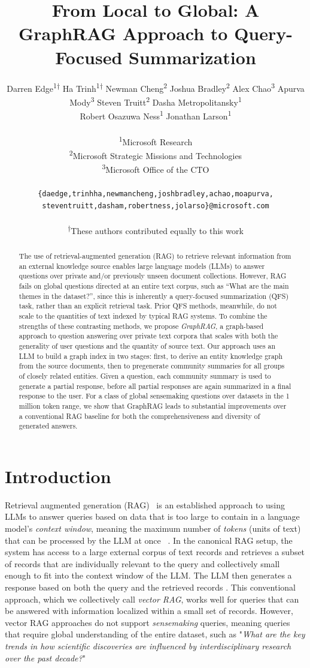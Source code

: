 \documentclass{article}
\title{From Local to Global: A GraphRAG Approach to Query-Focused Summarization}
\author{%
    Darren Edge\textsuperscript{1†} 
    \And Ha Trinh\textsuperscript{1†} 
    \And Newman Cheng\textsuperscript{2} 
    \And Joshua Bradley\textsuperscript{2} 
    \And Alex Chao\textsuperscript{3} 
    \And Apurva Mody\textsuperscript{3} 
    \And Steven Truitt\textsuperscript{2} 
    \And Dasha Metropolitansky\textsuperscript{1}\\ 
    \And Robert Osazuwa Ness\textsuperscript{1}
    \And Jonathan Larson\textsuperscript{1} \\\\
  \textsuperscript{1}Microsoft Research\\
  \textsuperscript{2}Microsoft Strategic Missions and Technologies\\
  \textsuperscript{3}Microsoft Office of the CTO\\
  \\ 
  \texttt{\{daedge,trinhha,newmancheng,joshbradley,achao,moapurva,} \\
  \small
\texttt{steventruitt,dasham,robertness,jolarso\}@microsoft.com} \\ \\
\small
\textsuperscript{†}These authors contributed equally to this work 
}
\begin{document}
\maketitle

\begin{abstract}
The use of retrieval-augmented generation (RAG) to retrieve relevant information from an external knowledge source enables large language models (LLMs) to answer questions over private and/or previously unseen document collections.
However, RAG fails on global questions directed at an entire text corpus, such as ``What are the main themes in the dataset?'', since this is inherently a query-focused summarization (QFS) task, rather than an explicit retrieval task.
Prior QFS methods, meanwhile, do not scale to the quantities of text indexed by typical RAG systems. 
To combine the strengths of these contrasting methods, we propose \textit{GraphRAG}, a graph-based approach to question answering over private text corpora that scales with both the generality of user questions and the quantity of source text.
Our approach uses an LLM to build a graph index in two stages: first, to derive an entity knowledge graph from the source documents, then to pregenerate community summaries for all groups of closely related entities.
Given a question, each community summary is used to generate a partial response, before all partial responses are again summarized in a final response to the user.
For a class of global sensemaking questions over datasets in the 1 million token range, we show that GraphRAG leads to substantial improvements over a conventional RAG baseline for both the comprehensiveness and diversity of generated answers.

\end{abstract}

\section{Introduction}

Retrieval augmented generation (RAG)~\citep{lewis2020retrieval} is an established approach to using LLMs to answer queries based on data that is too large to contain in a language model's \emph{context window}, meaning the maximum number of \emph{tokens} (units of text) that can be processed by the LLM at once ~\citep{liu-etal:2023:tacl, kuratov2024search}.
In the canonical RAG setup, the system has access to a large external corpus of text records and retrieves a subset of records that are individually relevant to the query and collectively small enough to fit into the context window of the LLM. The LLM then generates a response based on both the query and the retrieved records \citep{dang2006duc, yao2017recent, baumel2018query, laskar2020query}.
This conventional approach, which we collectively call \emph{vector RAG}, works well for queries that can be answered with information localized within a small set of records.
However, vector RAG approaches do not support \textit{sensemaking} queries, meaning queries that require global understanding of the entire dataset, such as "\emph{What are the key trends in how scientific discoveries are influenced by interdisciplinary research over the past decade?}"
\end{document}
